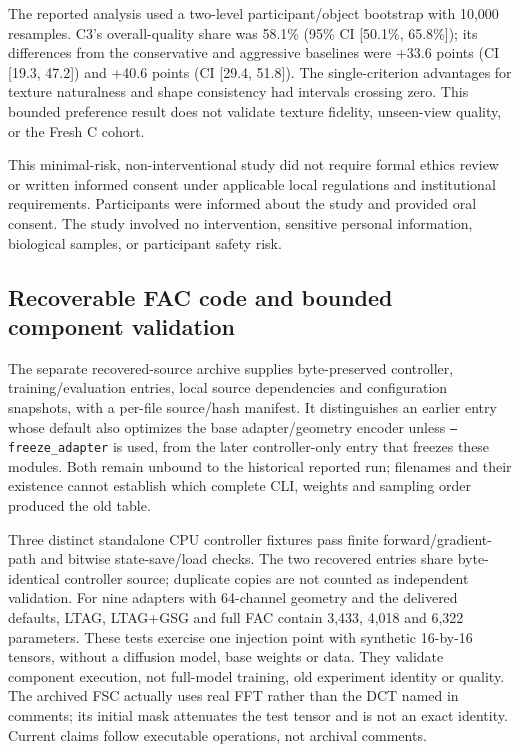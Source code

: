 \documentclass[11pt]{article}
\begin{document}
The reported analysis used a two-level participant/object bootstrap with 10,000 resamples. C3's overall-quality share was 58.1\% (95\% CI [50.1\%, 65.8\%]); its differences from the conservative and aggressive baselines were +33.6 points (CI [19.3, 47.2]) and +40.6 points (CI [29.4, 51.8]). The single-criterion advantages for texture naturalness and shape consistency had intervals crossing zero. This bounded preference result does not validate texture fidelity, unseen-view quality, or the Fresh C cohort.

This minimal-risk, non-interventional study did not require formal ethics review or written informed consent under applicable local regulations and institutional requirements. Participants were informed about the study and provided oral consent. The study involved no intervention, sensitive personal information, biological samples, or participant safety risk.

\FloatBarrier
\subsection*{Recoverable FAC code and bounded component validation}
The separate recovered-source archive supplies byte-preserved controller, training/evaluation entries, local source dependencies and configuration snapshots, with a per-file source/hash manifest. It distinguishes an earlier entry whose default also optimizes the base adapter/geometry encoder unless \texttt{--freeze\_adapter} is used, from the later controller-only entry that freezes these modules. Both remain unbound to the historical reported run; filenames and their existence cannot establish which complete CLI, weights and sampling order produced the old table.

Three distinct standalone CPU controller fixtures pass finite forward/gradient-path and bitwise state-save/load checks. The two recovered entries share byte-identical controller source; duplicate copies are not counted as independent validation. For nine adapters with 64-channel geometry and the delivered defaults, LTAG, LTAG+GSG and full FAC contain 3,433, 4,018 and 6,322 parameters. These tests exercise one injection point with synthetic 16-by-16 tensors, without a diffusion model, base weights or data. They validate component execution, not full-model training, old experiment identity or quality. The archived FSC actually uses real FFT rather than the DCT named in comments; its initial mask attenuates the test tensor and is not an exact identity. Current claims follow executable operations, not archival comments.
\end{document}
